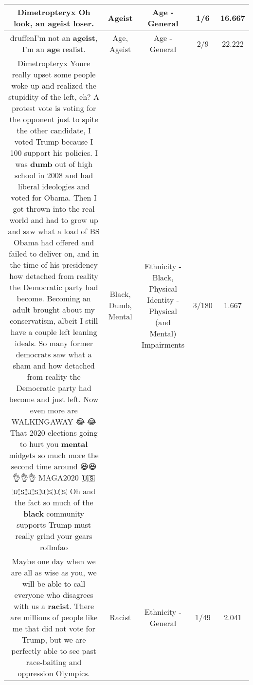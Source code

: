 \documentclass[11pt]{article}
\newlength\mylength
\begin{document}
\begin{center}
\begin{longtable}{|C{.65\mylength}|C{.30\mylength}|C{.12\mylength}|C{.12\mylength}|C{.12\mylength}|}
  \small Dimetropteryx Oh look, an \textbf{ageist} loser.\normalsize   & Ageist & Age - General & 1/6 & 16.667 \\  \hline
  \small druffenI'm not an \textbf{ageist}, I'm an \textbf{age} realist.\normalsize   & Age, Ageist & Age - General & 2/9 & 22.222 \\  \hline
  \small Dimetropteryx Youre really upset some people woke up and realized the stupidity of the left, eh?  A protest vote is voting for the opponent just to spite the other candidate, I voted Trump because I 100 support his policies.  I was \textbf{dumb} out of high school in 2008 and had liberal ideologies and voted for Obama.  Then I got thrown into the real world and had to grow up and saw what a load of BS Obama had offered and failed to deliver on, and in the time of his presidency how detached from reality the Democratic party had become.   Becoming an adult brought about my conservatism, albeit I still have a couple left leaning ideals. So many former democrats saw what a sham and how detached from reality the Democratic party had become and just left.  Now even more are WALKINGAWAY 😂🤣😂  That 2020 elections going to hurt you \textbf{mental} midgets so much more the second time around 😆😆👌👌👌  MAGA2020 🇺🇸🇺🇸🇺🇸🇺🇸🇺🇸  Oh and the fact so much of the \textbf{black} community supports Trump must really grind your gears roflmfao\normalsize   & Black, Dumb, Mental & Ethnicity - Black, Physical Identity - Physical (and Mental) Impairments & 3/180 & 1.667 \\  \hline
  \small Maybe one day when we are all as wise as you, we will be able to call everyone who disagrees with us a \textbf{racist}. There are millions of people like me that did not vote for Trump, but we are perfectly able to see past race-baiting and oppression Olympics.\normalsize   & Racist & Ethnicity - General & 1/49 & 2.041 \\  \hline

\end{longtable}
\end{center}
\end{document}
